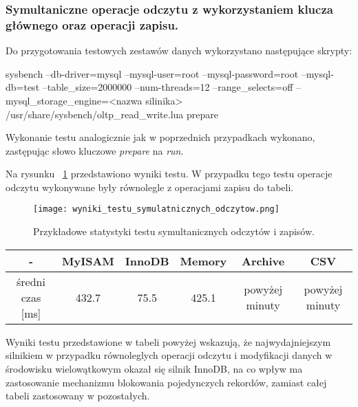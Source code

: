 \subsubsection{Symultaniczne operacje odczytu z wykorzystaniem klucza głównego oraz operacji zapisu.}

Do przygotowania testowych zestawów danych wykorzystano następujące skrypty:
\begin{spverbatim}
	sysbench --db-driver=mysql --mysql-user=root --mysql-password=root --mysql-db=test --table_size=2000000 --num-threads=12 --range_selects=off --mysql_storage_engine=<nazwa silinika>  /usr/share/sysbench/oltp_read_write.lua prepare
\end{spverbatim}

Wykonanie testu analogicznie jak w poprzednich przypadkach wykonano, zastępując słowo kluczowe \textit{prepare} na \textit{run}.


Na rysunku ~\ref{fig:wyniki_testu_symulatnicznych_odczytow} przedstawiono wyniki testu. W przypadku tego testu operacje odczytu wykonywane były równolegle z operacjami zapisu do tabeli.
\begin{figure}[H]
	\caption{Przykładowe statystyki testu symultanicznych odczytów i zapisów.}
	\centering
	\texttt{[image: wyniki\_testu\_symulatnicznych\_odczytow.png]}
	\label{fig:wyniki_testu_symulatnicznych_odczytow}
\end{figure}
\begin{center}
	\begin{tabular}{ | c | c | c | c | c | c |}
		\hline
		- & MyISAM & InnoDB & Memory & Archive & CSV  \\ 
		\hline
		średni czas [ms] & 432.7 & 75.5 & 425.1 & powyżej minuty & powyżej minuty \\
		\hline
	\end{tabular}
\end{center}
Wyniki testu przedstawione w tabeli powyżej wskazują, że najwydajniejszym silnikiem w przypadku równoleglych operacji odczytu i modyfikacji danych w środowisku wielowątkowym okazał się silnik InnoDB, na co wpływ ma zastosowanie mechanizmu blokowania pojedynczych rekordów, zamiast całej tabeli zastosowany w pozostałych.

